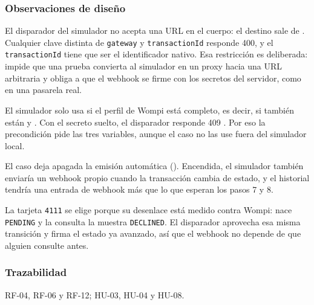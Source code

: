 \subsubsection{Observaciones de diseño}

El disparador del simulador no acepta una URL en el cuerpo: el destino sale de . Cualquier clave distinta de \texttt{gateway} y \texttt{transactionId} responde 400, y el \texttt{transactionId} tiene que ser el identificador nativo. Esa restricción es deliberada: impide que una prueba convierta al simulador en un proxy hacia una URL arbitraria y obliga a que el webhook se firme con los secretos del servidor, como en una pasarela real.

El simulador solo usa  si el perfil de Wompi está completo, es decir, si también están  y . Con el secreto suelto, el disparador responde 409 . Por eso la precondición pide las tres variables, aunque el caso no las use fuera del simulador local.

El caso deja apagada la emisión automática (). Encendida, el simulador también enviaría un webhook propio cuando la transacción cambia de estado, y el historial tendría una entrada de webhook más que lo que esperan los pasos 7 y 8.

La tarjeta \texttt{4111} se elige porque su desenlace está medido contra Wompi: nace \texttt{PENDING} y la consulta la muestra \texttt{DECLINED}. El disparador aprovecha esa misma transición y firma el estado ya avanzado, así que el webhook no depende de que alguien consulte antes.

\subsubsection{Trazabilidad}

RF-04, RF-06 y RF-12; HU-03, HU-04 y HU-08.
